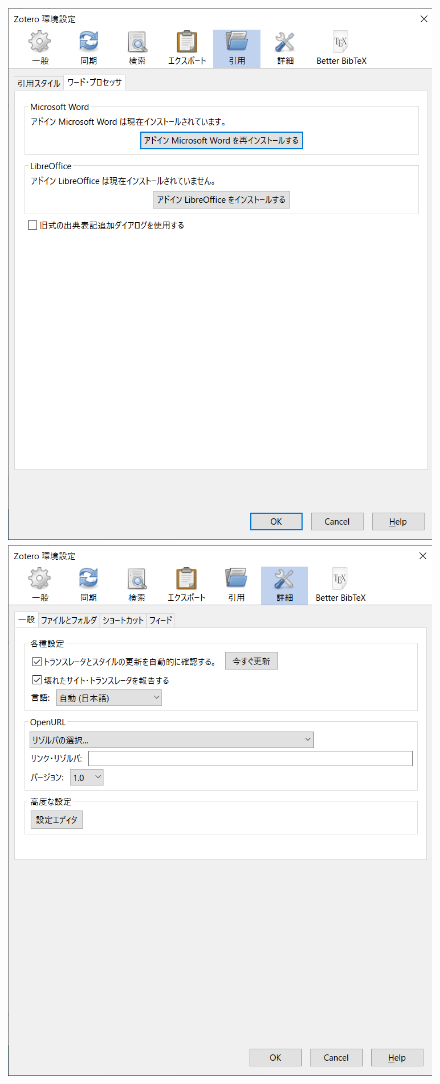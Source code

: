 \documentclass[a4paper,pdftex]{article}
\begin{document}
\begin{figure}[ht]
\begin{minipage}[ht]{0.19\columnwidth}
    \includegraphics[width=\columnwidth]{fig/zotero06.png}
  \end{minipage}
  \begin{minipage}[ht]{0.19\columnwidth}
    \centering
    \includegraphics[width=\columnwidth]{fig/zotero07.png}

\end{minipage}
\end{figure}
\end{document}
